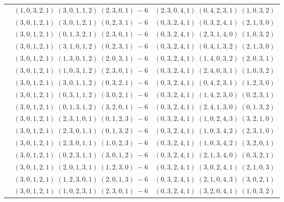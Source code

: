 \documentclass[11pt]{article}
\begin{document}
\begin{longtable}[l]{|c|c|c|}
 \cline{2-3} 
 & $(1 ,0 ,3 ,2 ,1) \;(3 ,0 ,1 ,1 ,2) \;(2 ,3 ,0 ,1) \;-6$ & $(2 ,3 ,0 ,4 ,1) \;(0 ,4 ,2 ,3 ,1) \;(1 ,0 ,3 ,2) \;$\\ 
 \cline{2-3} 
 & $(3 ,0 ,1 ,2 ,1) \;(3 ,0 ,1 ,2 ,1) \;(0 ,2 ,3 ,1) \;-6$ & $(0 ,3 ,2 ,4 ,1) \;(0 ,3 ,2 ,4 ,1) \;(2 ,1 ,3 ,0) \;$\\ 
 \cline{2-3} 
 & $(3 ,0 ,1 ,2 ,1) \;(0 ,1 ,3 ,2 ,1) \;(2 ,3 ,0 ,1) \;-6$ & $(0 ,3 ,2 ,4 ,1) \;(2 ,3 ,1 ,4 ,0) \;(1 ,0 ,3 ,2) \;$\\ 
 \cline{2-3} 
 & $(3 ,0 ,1 ,2 ,1) \;(3 ,1 ,0 ,1 ,2) \;(0 ,2 ,3 ,1) \;-6$ & $(0 ,3 ,2 ,4 ,1) \;(0 ,4 ,1 ,3 ,2) \;(2 ,1 ,3 ,0) \;$\\ 
 \cline{2-3} 
 & $(3 ,0 ,1 ,2 ,1) \;(1 ,3 ,0 ,1 ,2) \;(2 ,0 ,3 ,1) \;-6$ & $(0 ,3 ,2 ,4 ,1) \;(1 ,4 ,0 ,3 ,2) \;(2 ,0 ,3 ,1) \;$\\ 
 \cline{2-3} 
 & $(3 ,0 ,1 ,2 ,1) \;(1 ,0 ,3 ,1 ,2) \;(2 ,3 ,0 ,1) \;-6$ & $(0 ,3 ,2 ,4 ,1) \;(2 ,4 ,0 ,3 ,1) \;(1 ,0 ,3 ,2) \;$\\ 
 \cline{2-3} 
 & $(3 ,0 ,1 ,2 ,1) \;(3 ,0 ,1 ,1 ,2) \;(0 ,3 ,2 ,1) \;-6$ & $(0 ,3 ,2 ,4 ,1) \;(0 ,4 ,2 ,3 ,1) \;(1 ,2 ,3 ,0) \;$\\ 
 \cline{2-3} 
 & $(3 ,0 ,1 ,2 ,1) \;(0 ,3 ,1 ,1 ,2) \;(3 ,0 ,2 ,1) \;-6$ & $(0 ,3 ,2 ,4 ,1) \;(1 ,4 ,2 ,3 ,0) \;(0 ,2 ,3 ,1) \;$\\ 
 \cline{2-3} 
 & $(3 ,0 ,1 ,2 ,1) \;(0 ,1 ,3 ,1 ,2) \;(3 ,2 ,0 ,1) \;-6$ & $(0 ,3 ,2 ,4 ,1) \;(2 ,4 ,1 ,3 ,0) \;(0 ,1 ,3 ,2) \;$\\ 
 \cline{2-3} 
 & $(3 ,0 ,1 ,2 ,1) \;(2 ,3 ,1 ,0 ,1) \;(0 ,1 ,2 ,3) \;-6$ & $(0 ,3 ,2 ,4 ,1) \;(1 ,0 ,2 ,4 ,3) \;(3 ,2 ,1 ,0) \;$\\ 
 \cline{2-3} 
 & $(3 ,0 ,1 ,2 ,1) \;(2 ,3 ,0 ,1 ,1) \;(0 ,1 ,3 ,2) \;-6$ & $(0 ,3 ,2 ,4 ,1) \;(1 ,0 ,3 ,4 ,2) \;(2 ,3 ,1 ,0) \;$\\ 
 \cline{2-3} 
 & $(3 ,0 ,1 ,2 ,1) \;(2 ,3 ,0 ,1 ,1) \;(1 ,0 ,2 ,3) \;-6$ & $(0 ,3 ,2 ,4 ,1) \;(1 ,0 ,3 ,4 ,2) \;(3 ,2 ,0 ,1) \;$\\ 
 \cline{2-3} 
 & $(3 ,0 ,1 ,2 ,1) \;(0 ,2 ,3 ,1 ,1) \;(3 ,0 ,1 ,2) \;-6$ & $(0 ,3 ,2 ,4 ,1) \;(2 ,1 ,3 ,4 ,0) \;(0 ,3 ,2 ,1) \;$\\ 
 \cline{2-3} 
 & $(3 ,0 ,1 ,2 ,1) \;(2 ,0 ,1 ,3 ,1) \;(1 ,2 ,3 ,0) \;-6$ & $(0 ,3 ,2 ,4 ,1) \;(3 ,0 ,2 ,4 ,1) \;(2 ,1 ,0 ,3) \;$\\ 
 \cline{2-3} 
 & $(3 ,0 ,1 ,2 ,1) \;(1 ,2 ,3 ,0 ,1) \;(2 ,0 ,1 ,3) \;-6$ & $(0 ,3 ,2 ,4 ,1) \;(2 ,1 ,0 ,4 ,3) \;(3 ,0 ,2 ,1) \;$\\ 
 \cline{2-3} 
 & $(3 ,0 ,1 ,2 ,1) \;(1 ,0 ,2 ,3 ,1) \;(2 ,3 ,0 ,1) \;-6$ & $(0 ,3 ,2 ,4 ,1) \;(3 ,2 ,0 ,4 ,1) \;(1 ,0 ,3 ,2) \;$\\ 

\end{longtable}
\end{document}
